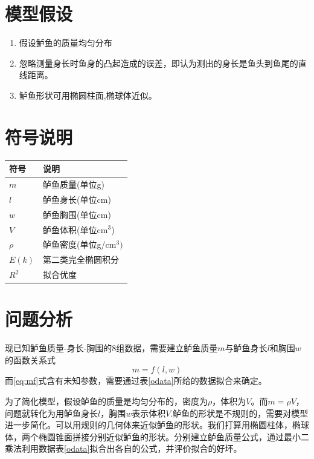\documentclass[UTF8,a4paper]{ctexart}
\numberwithin{equation}{section}%
\numberwithin{table}{section}
\numberwithin{figure}{section}
\begin{document}
\section{模型假设}
\begin{enumerate}[label=(\arabic*)]
\item 假设鲈鱼的质量均匀分布
\item 忽略测量身长时鱼身的凸起造成的误差，即认为测出的身长是鱼头到鱼尾的直线距离。
\item 鲈鱼形状可用椭圆柱面,椭球体近似。
\end{enumerate}
\section{符号说明}
\begin{table}[!htp]
\renewcommand\arraystretch{1.5}
\centering{}
\begin{tabular}{p{4.5cm}<{\centering}p{4.5cm}<{\centering}}
\toprule
符号 &说明\\
\midrule
$m$ &鲈鱼质量(单位g)\\
$l$ &鲈鱼身长(单位cm)\\
$w$ &鲈鱼胸围(单位cm)\\
$V$ &鲈鱼体积(单位cm${}^3$)\\
$\rho$ &鲈鱼密度(单位g/cm${^3})$\\
$E(k)$ &第二类完全椭圆积分\\
$R^2$ &拟合优度\\
\bottomrule
\end{tabular}
\end{table}
\section{问题分析}
现已知鲈鱼质量-身长-胸围的8组数据，需要建立鲈鱼质量$m$与鲈鱼身长$l$和胸围$w$的函数关系式
\begin{equation}\label{eq:mf}
	m=f(l,w)
\end{equation}
而\eqref{eq:mf}式含有未知参数，需要通过表\ref{odata}所给的数据拟合来确定。

为了简化模型，假设鲈鱼的质量是均匀分布的，密度为$\rho$，体积为$V$。而$m=\rho V$，问题就转化为用鲈鱼身长$l$，胸围$w$表示体积$V$.鲈鱼的形状是不规则的，需要对模型进一步简化。可以用规则的几何体来近似鲈鱼的形状。我们打算用椭圆柱体，椭球体，两个椭圆锥面拼接分别近似鲈鱼的形状。分别建立鲈鱼质量公式，通过最小二乘法利用数据表\ref{odata}拟合出各自的公式，并评价拟合的好坏。
\end{document}
